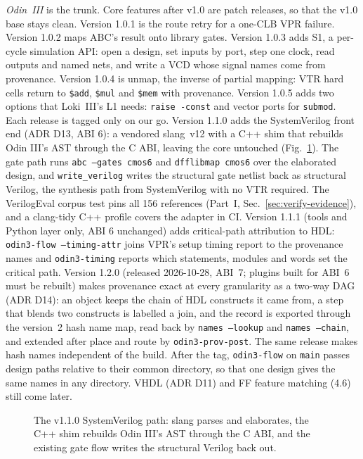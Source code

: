 \documentclass[conference]{IEEEtran}
\newcommand{\code}[1]{\texttt{#1}}
\begin{document}
\emph{Odin~III} is the trunk. Core features after v1.0 are patch releases, so that the v1.0 base
stays clean. Version 1.0.1 is the route retry for a one-CLB VPR failure. Version
1.0.2 maps ABC's result onto library gates. Version 1.0.3 adds S1, a per-cycle
simulation API: open a design, set inputs by port, step one clock, read outputs and named nets,
and write a VCD whose signal names come from provenance. Version 1.0.4 is unmap, the inverse of
partial mapping: VTR hard cells return to \code{\$add}, \code{\$mul} and \code{\$mem} with
provenance. Version 1.0.5 adds two options that Loki~III's L1 needs: \code{raise -const} and vector
ports for \code{submod}. Each release is tagged only on our go. Version 1.1.0 adds the SystemVerilog
front end (ADR D13, ABI 6): a vendored slang~v12 with a C++ shim that rebuilds Odin III's AST
through the C ABI, leaving the core untouched (Fig.~\ref{fig:sv}). The gate path runs
\code{abc --gates cmos6} and \code{dfflibmap cmos6} over the elaborated design, and
\code{write\_verilog} writes the structural gate netlist back as structural Verilog, the synthesis
path from SystemVerilog with no VTR required. The VerilogEval corpus test pins all 156 references
(Part~I, Sec.~\ref{sec:verify-evidence}), and a clang-tidy C++ profile covers the adapter in CI.
Version 1.1.1 (tools and Python layer only, ABI 6 unchanged) adds critical-path attribution to HDL:
\code{odin3-flow --timing-attr} joins VPR's setup timing report to the provenance names and
\code{odin3-timing} reports which statements, modules and words set the critical path. Version
1.2.0 (released 2026-10-28, ABI~7; plugins built for ABI~6 must be rebuilt) makes provenance exact
at every granularity as a two-way DAG (ADR D14): an object keeps the chain of HDL constructs it came
from, a step that blends two constructs is labelled a join, and the record is exported through
the version~2 hash name map, read back by \code{names --lookup} and \code{names --chain}, and extended
after place and route by \code{odin3-prov-post}. The same release makes hash names independent of the
build. After the tag, \code{odin3-flow} on \code{main} passes design paths relative to their common
directory, so that one design gives the same names in any directory.
VHDL (ADR D11) and FF feature matching (4.6) still come later.

\begin{figure}[t]
\centering
\odinfit{\columnwidth}{}
\caption{The v1.1.0 SystemVerilog path: slang parses and elaborates, the C++ shim rebuilds Odin III's AST through the C ABI, and the existing gate flow writes the structural Verilog back out.}
\label{fig:sv}
\end{figure}
\end{document}
